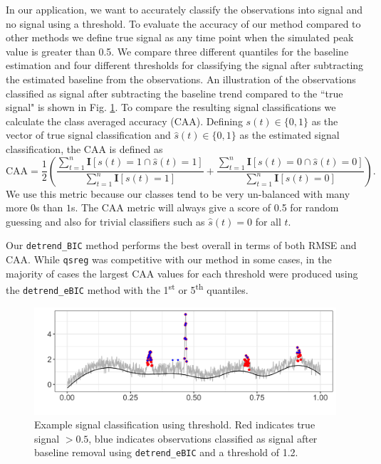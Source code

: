 \documentclass[12pt]{article}
\begin{document}
	In our application, we want to accurately classify the observations into signal and no signal using a threshold. To evaluate the accuracy of our method compared to other methods we define true signal as any time point when the simulated peak value is greater than 0.5. We compare three different quantiles for the baseline estimation and four different thresholds for classifying the signal after subtracting the estimated baseline from the observations.  An illustration of the observations classified as signal after subtracting the baseline trend compared to the ``true signal" is shown in Fig. \ref{fig:peaks_class_eg}. To compare the resulting signal classifications we calculate the class averaged accuracy (CAA). Defining $s(t) \in \{0,1\}$ as the vector of true signal classification and $\hat{s}(t) \in \{0,1\}$ as the estimated signal classification, the CAA is defined as
	\begin{equation}
	\mbox{CAA} = \frac{1}{2}\left(\frac{\sum_{t=1}^n \mathbf{I}[s(t) = 1 \cap \hat{s}(t)=1]}{\sum_{t=1}^n \mathbf{I}[s(t) = 1]} + \frac{\sum_{t=1}^n \mathbf{I}[s(t) = 0 \cap \hat{s}(t)=0]}{\sum_{t=1}^n \mathbf{I}[s(t) = 0]}\right).
	\end{equation}  
	We use this metric because our classes tend to be very un-balanced with many more $0$s than $1$s. The CAA metric will always give a score of 0.5 for random guessing and also for trivial classifiers such as $\hat{s}(t) = 0$ for all $t$. 

	Our \texttt{detrend\_BIC} method performs the best overall in terms of both RMSE and CAA. While \texttt{qsreg} was competitive with our method in some cases, in the majority of cases the largest CAA values for each threshold were produced using the \texttt{detrend\_eBIC} method with the 1\textsuperscript{st} or 5\textsuperscript{th} quantiles. 
	
	\begin{figure}[h!]
		\includegraphics[width = \linewidth]{Figures/peaks_eg_class.png}
		\caption{Example signal classification using threshold. Red indicates true signal $>0.5$, blue indicates observations classified as signal after baseline removal using \texttt{detrend\_eBIC} and a threshold of 1.2.}
		\label{fig:peaks_class_eg}
	\end{figure}
	
\end{document}
